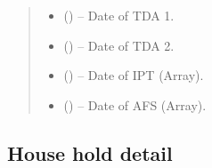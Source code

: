\documentclass[letterpaper,10pt,english,openany,oneside]{sphinxmanual}
\begin{document}
\begin{fulllineitems}
\begin{quote}
\begin{description}
\begin{itemize}
\item {} 
\sphinxAtStartPar
{} () – Date of TDA 1.

\item {} 
\sphinxAtStartPar
{} () – Date of TDA 2.

\item {} 
\sphinxAtStartPar
{} () – Date of IPT (Array).

\item {} 
\sphinxAtStartPar
{} () – Date of AFS (Array).

\end{itemize}

\end{description}\end{quote}

\end{fulllineitems}



\subsection{House hold detail}
\label{\detokenize{api-last-mile/v1:house-hold-detail}}
\end{document}
